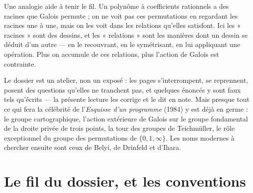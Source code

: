 \documentclass[11pt,a4paper]{article}
\begin{document}
\begin{resume}
Une analogie aide à tenir le fil. Un polynôme à coefficients rationnels a des
racines que Galois permute ; on ne voit pas ces permutations en regardant les
racines une à une, mais on les voit dans les relations qu'elles satisfont.
Ici les « racines » sont des dessins, et les « relations » sont les manières
dont un dessin se déduit d'un autre --- en le recouvrant, en le
symétrisant, en lui appliquant une opération. Plus on accumule de ces
relations, plus l'action de Galois est contrainte.

Le dossier est un atelier, non un exposé : les pages s'interrompent, se
reprennent, posent des questions qu'elles ne tranchent pas, et quelques
énoncés y sont faux tels qu'écrits --- la présente lecture les corrige et le
dit en note. Mais presque tout ce qui fera la célébrité de l'\emph{Esquisse
d'un programme} (1984) y est déjà en germe : le groupe cartographique,
l'action extérieure de Galois sur le groupe fondamental de la droite privée de
trois points, la tour des groupes de Teichmüller, le rôle exceptionnel du
groupe des permutations de $\{0,1,\infty\}$. Les noms modernes à chercher
ensuite sont ceux de Belyi, de Drinfeld et d'Ihara.

\end{resume}

\section*{Le fil du dossier, et les conventions}
\end{document}
